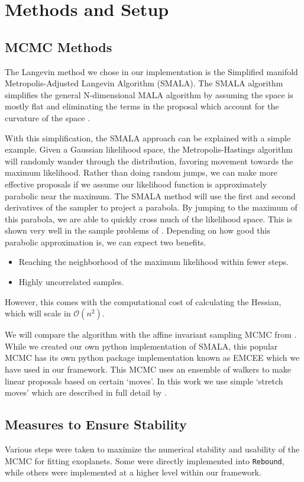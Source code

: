 \documentclass{aa}
\begin{document}
\section{Methods and Setup}\label{setup}
\subsection{MCMC Methods}
The Langevin method we chose in our implementation is the Simplified manifold Metropolis-Adjusted Langevin Algorithm (SMALA). The SMALA algorithm simplifies the general N-dimensional MALA algorithm by assuming the space is mostly flat and eliminating the terms in the proposal which account for the curvature of the space \cite{Girolami2011}.

With this simplification, the SMALA approach can be explained with a simple example. Given a Gaussian likelihood space, the Metropolis-Hastings algorithm will randomly wander through the distribution, favoring movement towards the maximum likelihood.
Rather than doing random jumps, we can make more effective proposals if we assume our likelihood function is approximately parabolic near the maximum. The SMALA method will use the first and second derivatives of the sampler to project a parabola. By jumping to the maximum of this parabola, we are able to quickly cross much of the likelihood space. This is shown very well in the sample problems of \cite{Girolami2011}. Depending on how good this parabolic approximation is, we can expect two benefits.
\begin{itemize}
\item Reaching the neighborhood of the maximum likelihood within fewer steps.
\item Highly uncorrelated samples.
\end{itemize}
However, this comes with the computational cost of calculating the Hessian, which will scale in $\mathcal{O}(n^2)$.

We will compare the algorithm with the affine invariant sampling MCMC from \cite{Foreman-Mackey2013}. While we created our own python implementation of SMALA, this popular MCMC has its own python package implementation known as EMCEE which we have used in our framework. This MCMC uses an ensemble of walkers to make linear proposals based on certain `moves'. In this work we use simple `stretch moves' which are described in full detail by \citep{Foreman-Mackey2013}.

\subsection{Measures to Ensure Stability}
Various steps were taken to maximize the numerical stability and usability of the MCMC for fitting exoplanets. Some were directly implemented into \texttt{Rebound}, while others were implemented at a higher level within our framework.
\end{document}
